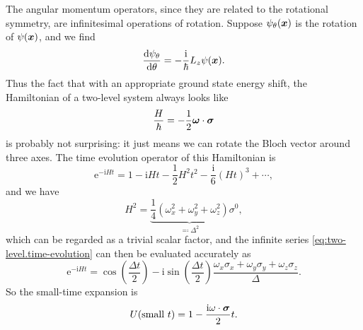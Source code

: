 \documentclass[hyperref, a4paper]{article}
\newcommand*{\ii}{\mathrm{i}}
\newcommand*{\ee}{\mathrm{e}}
\begin{document}
The angular momentum operators, 
since they are related to the rotational symmetry, 
are infinitesimal operations of rotation. 
Suppose $\psi_\theta (\vb*{x})$ is 
the rotation of $\psi(\vb*{x})$, 
and we find 
\begin{equation}
    \dv{\psi_\theta}{\theta} = - \frac{\ii}{\hbar} L_z \psi(\vb*{x}).
\end{equation}
Thus the fact that with an appropriate ground state energy shift,
the Hamiltonian of a two-level system always looks like 
\begin{equation}
    \frac{H}{\hbar} = - \frac{1}{2} \vb*{\omega} \cdot \vb*{\sigma}
\end{equation}
is probably not surprising: 
it just means we can rotate the Bloch vector around three axes. 
The time evolution operator of this Hamiltonian is 
\begin{equation}
    \ee^{- \ii H t} = 1 - \ii H t - \frac{1}{2} H^2 t^2 - \frac{\ii}{6} (Ht)^3 + \cdots,
    \label{eq:two-level.time-evolution}
\end{equation}
and we have 
\begin{equation}
    H^2 = \underbrace{\frac{1}{4} (\omega_x^2 + \omega_y^2 + \omega_z^2)}_{\eqqcolon \Delta^2} \sigma^0,
\end{equation}
which can be regarded as a trivial scalar factor, 
and the infinite series \eqref{eq:two-level.time-evolution} can then be evaluated accurately as 
\begin{equation}
    \ee^{- \ii H t} = \cos(\frac{\Delta t}{2}) 
    - \ii \sin(\frac{\Delta t}{2}) \frac{
        \omega_x \sigma_x + \omega_y \sigma_y + \omega_z \sigma_z
    }{\Delta}.
\end{equation}
So the small-time expansion is 
\begin{equation}
    U(\text{small $t$}) = 1 - \frac{\ii \omega \cdot \vb*{\sigma}}{2} t.
\end{equation}
\end{document}
